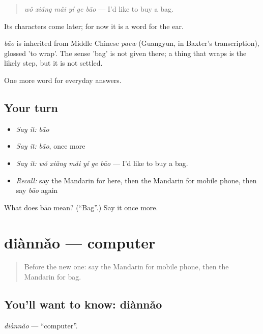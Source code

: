 \begin{quote}
\emph{wǒ xiǎng mǎi yí ge bāo} — I'd like to buy a bag.
\end{quote}

Its characters come later; for now it is a word for the ear.

\begin{cousinweb}
\emph{bāo} is inherited from Middle Chinese \emph{paew} (Guangyun, in Baxter's transcription), glossed 'to wrap'. The sense 'bag' is not given there; a thing that wraps is the likely step, but it is not settled.
\end{cousinweb}

\begin{grammarlens}[title={What you've built}]
One more word for everyday answers.
\end{grammarlens}

\subsection*{Your turn}
\begin{itemize}
\raggedright
  \item \emph{Say it:} \emph{bāo}
  \item \emph{Say it:} \emph{bāo}, once more
  \item \emph{Say it:} \emph{wǒ xiǎng mǎi yí ge bāo} — I'd like to buy a bag.
  \item \emph{Recall:} say the Mandarin for here, then the Mandarin for mobile phone, then say \emph{bāo} again
\end{itemize}

\begin{tcolorbox}[breakable,colback=teal!4,colframe=teal!35!black,title={Before you move on}]
What does bāo mean? (\textquotedblleft{}Bag\textquotedblright{}.) Say it once more.
\end{tcolorbox}
\section[diànnǎo]{diànnǎo — computer}

\label{lesson:ZH-C58-diannao}



\begin{quote}
Before the new one: say the Mandarin for mobile phone, then the Mandarin for bag.
\end{quote}

\subsection*{You'll want to know: diànnǎo}
\emph{diànnǎo} — \textquotedblleft{}computer\textquotedblright{}.

